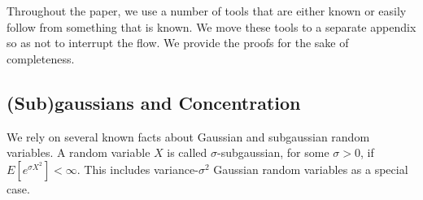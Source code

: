 Throughout the paper, we use a number of tools that are either known or easily follow from something that is known. We move these tools to a separate appendix so as not to interrupt the flow. We provide the proofs for the sake of completeness.

\subsection{(Sub)gaussians and Concentration}

We rely on several known facts about Gaussian and subgaussian random variables. A random variable $X$ is called $\sigma$-subgaussian, for some $\sigma>0$, if $E[e^{\sigma X^2}]<\infty$. This includes variance-$\sigma^2$ Gaussian random variables as a special case.



